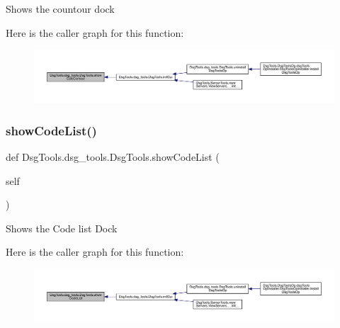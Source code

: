 \begin{DoxyVerb}Shows the countour dock
\end{DoxyVerb}
 Here is the caller graph for this function\+:
\nopagebreak
\begin{figure}[H]
\begin{center}
\leavevmode
\includegraphics[width=350pt]{class_dsg_tools_1_1dsg__tools_1_1_dsg_tools_a0b23a5c6211556c29aeccba77b404a90_icgraph}
\end{center}
\end{figure}
\mbox{\label{class_dsg_tools_1_1dsg__tools_1_1_dsg_tools_a7fdaafbd56834d50d0b04170c5c93acd}} 
\subsubsection{\texorpdfstring{show\+Code\+List()}{showCodeList()}}
{\footnotesize\ttfamily def Dsg\+Tools.\+dsg\+\_\+tools.\+Dsg\+Tools.\+show\+Code\+List (\begin{DoxyParamCaption}\item[{}]{self }\end{DoxyParamCaption})}

\begin{DoxyVerb}Shows the Code list Dock
\end{DoxyVerb}
 Here is the caller graph for this function\+:
\nopagebreak
\begin{figure}[H]
\begin{center}
\leavevmode
\includegraphics[width=350pt]{class_dsg_tools_1_1dsg__tools_1_1_dsg_tools_a7fdaafbd56834d50d0b04170c5c93acd_icgraph}
\end{center}
\end{figure}
\mbox{\label{class_dsg_tools_1_1dsg__tools_1_1_dsg_tools_a2a6302cf6e4fe28b23ffbf9ae6688f1c}} 
